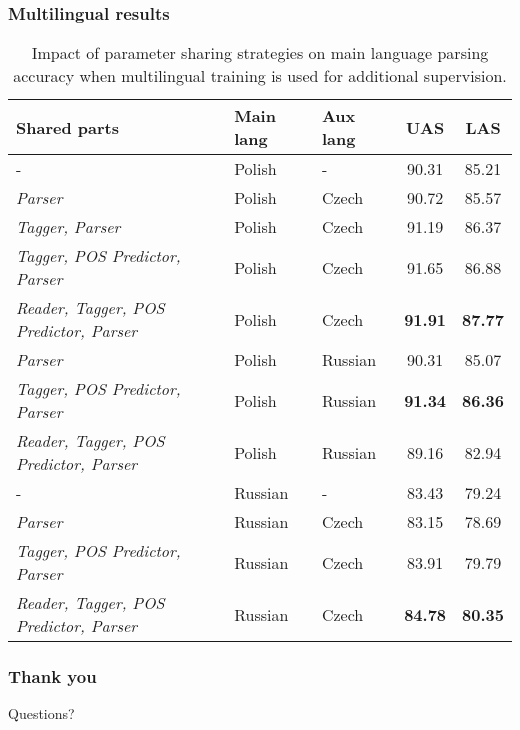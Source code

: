 \documentclass{beamer}
\begin{document}
\begin{frame}
    \frametitle{Multilingual results}
    {\scriptsize
    \begin{table}[!htbp]
      \centering  
      \begin{tabular}{l | l l c c}
        Shared parts & Main lang & Aux lang & UAS & LAS \\ \hline
          - & Polish & - & 90.31 & 85.21 \\
        \emph{Parser} & Polish & Czech & 90.72 & 85.57 \\ %
        \emph{Tagger, Parser} & Polish & Czech & 91.19 & 86.37 \\ %
        \emph{Tagger, POS Predictor, Parser} & Polish & Czech & 91.65 & 86.88 \\ %
        \emph{Reader, Tagger, POS Predictor, Parser} & Polish & Czech & \textbf{91.91} & \textbf{87.77} \\\hline %
        \emph{Parser} & Polish & Russian & 90.31 & 85.07 \\  %
        \emph{Tagger, POS Predictor, Parser} & Polish & Russian &
        \textbf{91.34} & \textbf{86.36} \\ 
        \emph{Reader, Tagger, POS Predictor, Parser} & Polish & Russian & 89.16 & 82.94 \\  %
    \hline\hline %
        - & Russian & - & 83.43 & 79.24 \\
        \emph{Parser} & Russian & Czech & 83.15 & 78.69 \\  %
        \emph{Tagger, POS Predictor, Parser} & Russian & Czech & 83.91 & 79.79 \\ %
        \emph{Reader, Tagger, POS Predictor, Parser} & Russian & Czech & \textbf{84.78} & \textbf{80.35} %
      \end{tabular}
      \label{tab:multi_baseline}
      \caption{Impact of parameter sharing strategies on main language parsing accuracy when multilingual training
        is used for additional supervision.}
    \end{table}
    }
\end{frame}
%

\begin{frame}
    \frametitle{Thank you}
    \begin{center}
        {\Huge Questions?}
    \end{center}
\end{frame}
\end{document}
